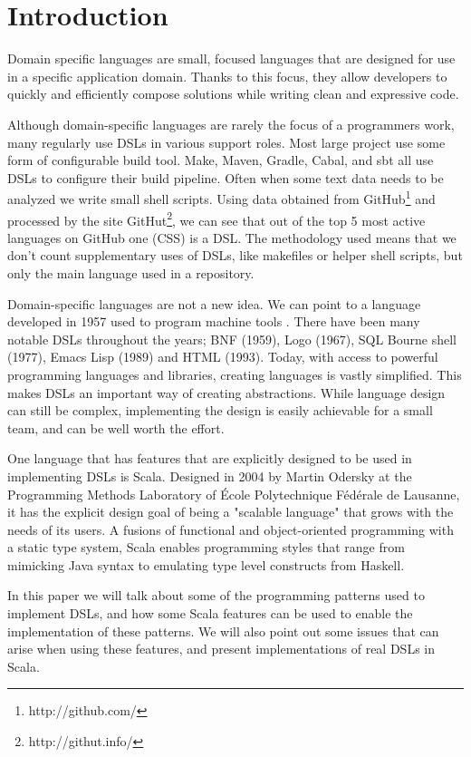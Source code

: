 \chapter{Introduction}

Domain specific languages are small, focused languages that are designed for use in a specific application domain.
Thanks to this focus, they allow developers to quickly and efficiently compose solutions while writing clean and expressive code.

Although domain-specific languages are rarely the focus of a programmers work, many regularly use DSLs in various support roles.
Most large project use some form of configurable build tool.
Make, Maven, Gradle, Cabal, and sbt all use DSLs to configure their build pipeline.
Often when some text data needs to be analyzed we write small shell scripts.
Using data obtained from GitHub\footnote{http://github.com/} and processed by the site GitHut\footnote{http://githut.info/}, we can see that out of the top 5 most active languages on GitHub one (CSS) is a DSL.
The methodology used means that we don't count supplementary uses of DSLs, like makefiles or helper shell scripts, but only the main language used in a repository.

Domain-specific languages are not a new idea.
We can point to a language developed in 1957 used to program machine tools \cite{Ross:1978}.
There have been many notable DSLs throughout the years; BNF (1959), Logo (1967), SQL Bourne shell (1977), Emacs Lisp (1989) and HTML (1993).
Today, with access to powerful programming languages and libraries, creating languages is vastly simplified.
This makes DSLs an important way of creating abstractions.
While language design can still be complex, implementing the design is easily achievable for a small team, and can be well worth the effort.

One language that has features that are explicitly designed to be used in implementing DSLs is Scala.
Designed in 2004 by Martin Odersky at the Programming Methods Laboratory of \'Ecole Polytechnique F\'ed\'erale de Lausanne, it has the explicit design goal of being a "scalable language" that grows with the needs of its users.
A fusions of functional and object-oriented programming with a static type system, Scala enables programming styles that range from mimicking Java syntax to emulating type level constructs from Haskell.

In this paper we will talk about some of the programming patterns used to implement DSLs, and how some Scala features can be used to enable the implementation of these patterns.
We will also point out some issues that can arise when using these features, and present implementations of real DSLs in Scala.